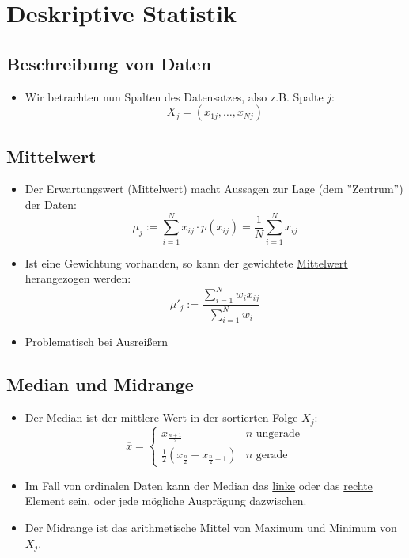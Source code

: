 \documentclass{scrartcl}
\begin{document}
\pagebreak
\section{Deskriptive Statistik}

\subsection{Beschreibung von Daten}

\begin{itemize}
	\item Wir betrachten nun Spalten des Datensatzes, also z.B. Spalte $ j $:
	\[ X_j = (x_{1j},\ldots,x_{Nj}) \]
\end{itemize}

\subsection{Mittelwert}

\begin{itemize}
	\item Der Erwartungswert (Mittelwert) macht Aussagen zur Lage (dem 
	''Zentrum'') der Daten:
	\[ \mu_j := \sum_{i=1}^{N} x_{ij} \cdot p(x_{ij}) = \frac{1}{N} 
	\sum_{i=1}^{N} x_{ij} \]
	\item Ist eine Gewichtung vorhanden, so kann der gewichtete 
	\underline{Mittelwert} herangezogen werden:
	\[ \mu'_j := \frac{\sum_{i=1}^{N} w_i x_{ij}}{\sum_{i=1}^{N} w_i} \]
	\item Problematisch bei Ausreißern
\end{itemize}

\subsection{Median und Midrange}

\begin{itemize}
	\item Der Median ist der mittlere Wert in der \underline{sortierten} Folge 
	$ X_j $:
	\[ \overline{x} = \begin{cases}
		x_{\frac{n+1}{2}} & n \text{ ungerade} \\
		\frac{1}{2}(x_{\frac{n}{2}} + x_{\frac{n}{2} + 1}) & n \text{ gerade}
	\end{cases} \]
	\item Im Fall von ordinalen Daten kann der Median das \underline{linke} 
	oder das \underline{rechte} Element sein, oder jede mögliche Ausprägung 
	dazwischen.
	\item Der Midrange ist das arithmetische Mittel von Maximum und Minimum von 
	$ X_j $.
\end{itemize}
\end{document}
